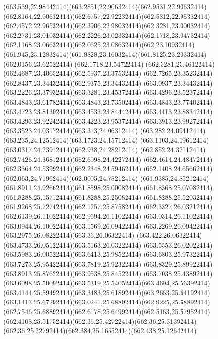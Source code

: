 {{	\curveto(663.539,22.98442414)(663.2851,22.90632414)(662.9531,22.90632414)
	\curveto(662.8164,22.90632414)(662.6757,22.92232414)(662.5312,22.95332414)
	\curveto(662.4572,22.96532414)(662.3906,22.98032414)(662.3281,23.00032414)
	\curveto(662.2731,23.01032414)(662.2226,23.02332414)(662.1718,23.04732414)
	\curveto(662.1168,23.06632414)(662.0625,23.08632414)(662,23.10932414)
	\curveto(661.945,23.12832414)(661.8828,23.16032414)(661.8125,23.20332414)
	\lineto(662.0156,23.62522414)
	\lineto(662.1718,23.54722414)
	\curveto(662.3281,23.46122414)(662.4687,23.40652414)(662.5937,23.37532414)
	\curveto(662.7265,23.35232414)(662.8437,23.34432414)(662.9375,23.34432414)
	\curveto(663.0937,23.34432414)(663.2226,23.37932414)(663.3281,23.45372414)
	\curveto(663.4296,23.52372414)(663.4843,23.61782414)(663.4843,23.73502414)
	\curveto(663.4843,23.77402414)(663.4723,23.81302414)(663.4533,23.84442414)
	\curveto(663.4413,23.88342414)(663.4293,23.92242414)(663.4223,23.95372414)
	\curveto(663.3913,23.99272414)(663.3523,24.03172414)(663.313,24.06312414)
	\curveto(663.282,24.09412414)(663.235,24.12512414)(663.1723,24.15712414)
	\curveto(663.1103,24.19612414)(663.0317,24.23912414)(662.938,24.28212414)
	\curveto(662.852,24.32112414)(662.7426,24.36812414)(662.6098,24.42272414)
	\curveto(662.4614,24.48472414)(662.3364,24.53992414)(662.2348,24.59462414)
	\curveto(662.1408,24.65662414)(662.063,24.71962414)(662.0005,24.78212414)
	\curveto(661.9385,24.85212414)(661.8911,24.92662414)(661.8598,25.00082414)
	\curveto(661.8368,25.07082414)(661.8288,25.15712414)(661.8288,25.25082414)
	\curveto(661.8288,25.52032414)(661.9268,25.72742414)(662.1257,25.87582414)
	\curveto(662.3327,26.03212414)(662.6139,26.11022414)(662.9694,26.11022414)
	\curveto(663.0314,26.11022414)(663.0944,26.10022414)(663.1569,26.09422414)
	\curveto(663.2269,26.09422414)(663.2975,26.08222414)(663.36,26.06322414)
	\curveto(663.422,26.06322414)(663.4733,26.05122414)(663.5163,26.03222414)
	\curveto(663.5553,26.02022414)(663.5983,26.00522414)(663.6413,25.98522414)
	\curveto(663.6803,25.97322414)(663.7273,25.95422414)(663.7819,25.92322414)
	\curveto(663.8329,25.89922414)(663.8913,25.87622414)(663.9538,25.84522414)
	\lineto(663.7038,25.43892414)
	\curveto(663.6098,25.50092414)(663.5319,25.54052414)(663.4694,25.56392414)
	\curveto(663.4144,25.59492414)(663.3483,25.61892414)(663.2663,25.64192414)
	\curveto(663.1413,25.67292414)(663.0241,25.68892414)(662.9225,25.68892414)
	\curveto(662.7546,25.68892414)(662.6178,25.64992414)(662.5163,25.57952414)
	\curveto(662.4108,25.51752414)(662.36,25.42722414)(662.36,25.31392414)
	\curveto(662.36,25.22792414)(662.384,25.16552414)(662.438,25.12642414)
}}

